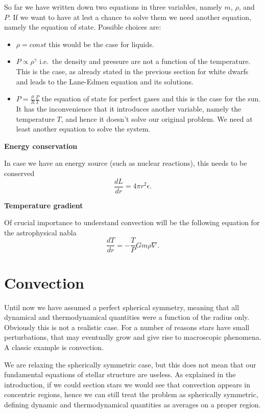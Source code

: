 So far we have written down two equations in three variables, namely $m$, $\rho$, and $P$. If we want to have at lest a chance to solve them we need another equation, namely the equation of state. Possible choices are:
\begin{itemize}
	\item $\rho=const$ this would be the case for liquids.
	\item $P\propto \rho^\gamma$ i.e.\ the density and pressure are not a function of the temperature. This is the case, as already stated in the previous section for white dwarfs and leads to the Lane-Edmen equation and its solutions.
	\item $P=\frac{\mu}{R}\frac{P}{T}$ the equation of state for perfect gases and this is the case for the sun. It has the inconvenience that it introduces another variable, namely the temperature $T$, and hence it doesn't solve our original problem. We need at least another equation to solve the system. 
\end{itemize}

\textbf{Energy conservation} 

In case we have an energy source (such as nuclear reactions), this needs to be conserved
\begin{equation}\label{energycons}
	\frac{dL}{dr} = 4 \pi r^2 \epsilon.
\end{equation}

\textbf{Temperature gradient} 

Of crucial importance to understand convection will be the following equation for the astrophysical nabla
\begin{equation}\label{energytransfer}
\frac{d T}{d r} = - \frac{T }{P} G m \rho\nabla.
\end{equation}


\section{Convection}
Until now we have assumed a perfect spherical symmetry, meaning that all dynamical and thermodynamical quantities were a function of the radius only. Obviously this is not a realistic case. For a number of reasons stars have small perturbations, that may eventually grow and give rise to macroscopic phenomena. A classic example is convection.

We are relaxing the spherically symmetric case, but this does not mean that our fundamental equations of stellar structure are useless. As explained in the introduction, if we could section stars we would see that convection appears in concentric regions, hence  we can still treat the problem as spherically symmetric, defining dynamic and thermodynamical quantities as averages on a proper region. 

